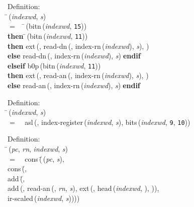 \begin{tabbing}{\sc Definition}: \\  
\=\,({\it{indexwd\/}}, {\it{s\/}}) \\ 
$=$$\;\;\;\;$\=\,({\rm{bitn}}\,({\it{indexwd\/}}, {\tt{15}})) \\ 
{\bf then }\=\,({\rm{bitn}}\,({\it{indexwd\/}}, {\tt{11}})) \\ 
{\bf then }{\rm{ext}}\,({}, {\rm{read-dn}}\,({}, {\rm{index-rn}}\,({\it{indexwd\/}}), {\it{s\/}}), {}) \\ 
{\bf else }{\rm{read-dn}}\,({}, {\rm{index-rn}}\,({\it{indexwd\/}}), {\it{s\/}})$\;${\bf  endif}\- \\ 
{\bf elseif }{\rm{b0p}}\,({\rm{bitn}}\,({\it{indexwd\/}}, {\tt{11}})) \\ 
{\bf then }{\rm{ext}}\,({}, {\rm{read-an}}\,({}, {\rm{index-rn}}\,({\it{indexwd\/}}), {\it{s\/}}), {}) \\ 
{\bf else }{\rm{read-an}}\,({}, {\rm{index-rn}}\,({\it{indexwd\/}}), {\it{s\/}})$\;${\bf  endif}\-\-
\end{tabbing}

\begin{tabbing}{\sc Definition}: \\  
\=\,({\it{indexwd\/}}, {\it{s\/}}) \\ 
$=$$\;\;\;\;${\rm{asl}}\,({}, {\rm{index-register}}\,({\it{indexwd\/}}, {\it{s\/}}), {\rm{bits}}\,({\it{indexwd\/}}, {\tt{9}}, {\tt{10}}))\-
\end{tabbing}

\begin{tabbing}{\sc Definition}: \\  
\=\,({\it{pc\/}}, {\it{rn\/}}, {\it{indexwd\/}}, {\it{s\/}}) \\ 
$=$$\;\;\;\;${\rm{cons}}\,(\=\,({\it{pc\/}}, {\it{s\/}}), \\ 
{\rm{cons}}\,(\=, \\ 
{\rm{add}}\,(\=, \\ 
{\rm{add}}\,({}, {\rm{read-an}}\,({}, {\it{rn\/}}, {\it{s\/}}), {\rm{ext}}\,({}, {\rm{head}}\,({\it{indexwd\/}}, {}), {})), \\ 
{\rm{ir-scaled}}\,({\it{indexwd\/}}, {\it{s\/}}))\-)\-)\-\-
\end{tabbing}

